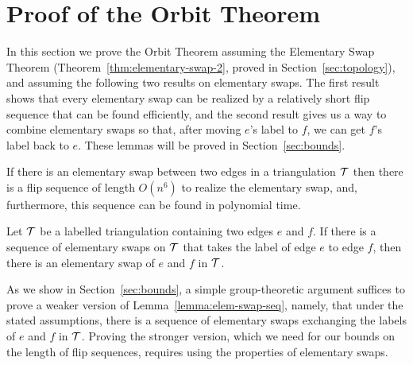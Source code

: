 
\section{Proof of the Orbit Theorem}
\label{sec:reductions}

In this section we prove the Orbit Theorem assuming the Elementary Swap Theorem (Theorem~\ref{thm:elementary-swap-2}, proved in Section~\ref{sec:topology}), and assuming the following two results on elementary swaps.
The first result shows that 
every elementary swap can be realized by a relatively short flip sequence that can be found efficiently,
and the second result gives us a way to combine elementary swaps so that, after moving $e$'s label to $f$, we can get $f$'s label back to $e$.
These lemmas will be proved in Section~\ref{sec:bounds}. 

\begin{lemma}
\label{lemma:elem-swap}
If there is an elementary swap between two edges in a triangulation $\cal T$ then there is a flip sequence of length $O(n^6)$ to realize the elementary swap, and, furthermore, this sequence can be found in polynomial time.
\end{lemma}


\begin{lemma} 
\label{lemma:elem-swap-seq}
Let $\cal T$ be a labelled triangulation containing two edges $e$ and $f$.   If there is a sequence of elementary swaps on $\cal T$ that takes the label of edge $e$ to edge $f$, then there is 
an elementary swap of $e$ and $f$ in $\cal T$.
\end{lemma}

As we show in Section~\ref{sec:bounds}, 
a simple group-theoretic argument suffices to prove a weaker version of Lemma~\ref{lemma:elem-swap-seq}, namely, that under the stated assumptions, there is a sequence of elementary swaps exchanging the labels of $e$ and $f$ in $\cal T$.  
Proving the stronger version, which we need for our bounds on the length of flip sequences, requires using the properties of elementary swaps.

